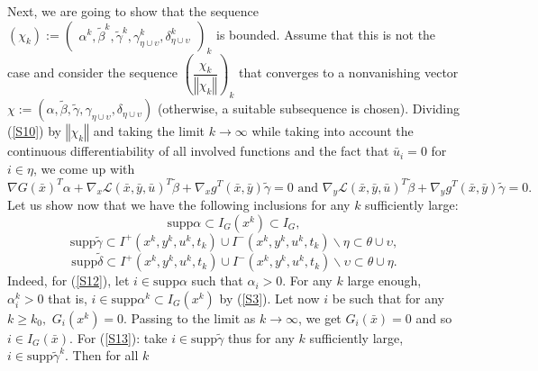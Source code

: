 	 Next, we are going to show that the sequence
	$(\chi_{k}):=
	\begin{pmatrix}
	\alpha^{k},\tilde{\beta}^{k},\tilde{\gamma}^{k},\gamma
	_{\eta\cup\upsilon}^{k},\delta
	_{\eta\cup\upsilon}^{k}
	\end{pmatrix}
	_{k}$ is bounded. Assume that this is not the case and consider the sequence
	$\left(\dfrac{\chi_{k}}{\left\Vert \chi_{k}\right\Vert }\right)_{k}$ that converges to a
	nonvanishing vector $\chi:=(\alpha,\tilde{\beta},\tilde{\gamma
	},\gamma_{\eta\cup\upsilon},\delta_{\eta\cup\upsilon})$ (otherwise, a suitable subsequence is chosen).
	Dividing (\ref{S10}) by $\left\Vert \chi_{k}\right\Vert $ and taking the limit
	$k\rightarrow\infty$ while taking into account the continuous differentiability of all
	involved functions and the fact that $\bar{u}_{i}=0$ for $i\in\eta$, we come up with
	\begin{equation}\label{CQ}%
	\nabla G(\bar{x})^{T}\alpha+\nabla_{x}\mathcal{L}(\bar{x},\bar{y},\bar{u})^{T}\tilde{\beta}+\nabla_{x}g^{T}(\bar{x},\bar{y})\tilde{\gamma}=0
	\mbox{ and }
	\nabla_{y}\mathcal{L}(\bar{x},\bar{y},\bar{u})^{T}\tilde{\beta}+\nabla_{y}g^{T}(\bar{x},\bar{y})\tilde{\gamma}=0.
	\end{equation}
		Let us show now that we have the following inclusions for any $k$ sufficiently large:
	\begin{equation}
	\mathrm{supp}\alpha\subset I_{G}(x^{k})\subset I_{G},\label{S12}%
	\end{equation}%
	\begin{equation}
	\mathrm{supp}\tilde{\gamma}\subset I^{+}(x^{k},y^{k},u^{k},t_{k})\cup I^{-}(x^{k},y^{k},u^{k},t_{k})\backslash\eta\subset\theta\cup\upsilon,\label{S13}%
	\end{equation}
	\begin{equation}
	\mathrm{supp}\tilde{\delta}\subset I^{+}(x^{k},y^{k},u^{k},t_{k})\cup I^{-}(x^{k},y^{k},u^{k},t_{k})\backslash\upsilon\subset\theta\cup \eta.\label{S14}%
	\end{equation}
	Indeed, for (\ref{S12}), let $i\in\mathrm{supp}\alpha$ such that $\alpha_{i}>0$.
	For any $k$ large enough, $\alpha_{i}^{k}>0$ that is, $i\in \mathrm{supp}\alpha^{k}\subset I_{G}(x^{k})$ by (\ref{S3}). Let now $i$ be such that for any $k\geq k_{0},$ $G_{i}(x^{k})=0$. Passing to
	the limit as $k\rightarrow\infty$, we get $G_{i}(\bar{x})=0$ and so $i\in I_{G}(\bar{x}).$ For (\ref{S13}): take $i\in
	\mathrm{supp}\tilde{\gamma}$ thus for any $k$ sufficiently large,  $i\in\mathrm{supp}\tilde{\gamma}^{k}.$ Then for all $k$
